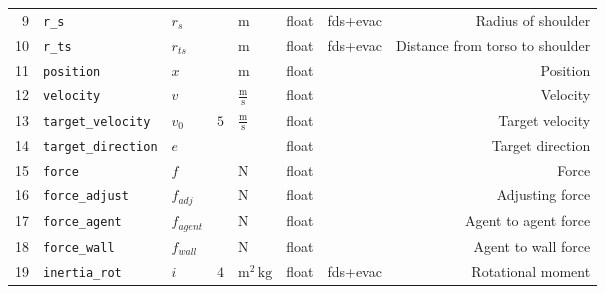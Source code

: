 \begin{table}[H]
\begin{tabularx}{1.0\linewidth}{rllllllR}
9  &                      \verb|r_s| &          $r_{s}$ &                                     &                 $\mathrm{m}$ &       float &   fds+evac &                                 Radius of shoulder \\
10 &                     \verb|r_ts| &         $r_{ts}$ &                                     &                 $\mathrm{m}$ &       float &   fds+evac &                    Distance from torso to shoulder \\
11 &                 \verb|position| &              $x$ &                                     &                 $\mathrm{m}$ &       float &            &                                           Position \\
12 &                 \verb|velocity| &              $v$ &                                     &       $\mathrm{\frac{m}{s}}$ &       float &            &                                           Velocity \\
13 &          \verb|target_velocity| &          $v_{0}$ &                                 $5$ &       $\mathrm{\frac{m}{s}}$ &       float &            &                                    Target velocity \\
14 &         \verb|target_direction| &              $e$ &                                     &                              &       float &            &                                   Target direction \\
15 &                    \verb|force| &              $f$ &                                     &                 $\mathrm{N}$ &       float &            &                                              Force \\
16 &             \verb|force_adjust| &        $f_{adj}$ &                                     &                 $\mathrm{N}$ &       float &            &                                    Adjusting force \\
17 &              \verb|force_agent| &      $f_{agent}$ &                                     &                 $\mathrm{N}$ &       float &            &                               Agent to agent force \\
18 &               \verb|force_wall| &       $f_{wall}$ &                                     &                 $\mathrm{N}$ &       float &            &                                Agent to wall force \\
19 &              \verb|inertia_rot| &              $i$ &                                 $4$ &         $\mathrm{m^{2}\,kg}$ &       float &   fds+evac &                                  Rotational moment \\

\end{tabularx}
\end{table}
